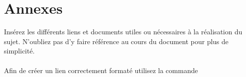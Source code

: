 \section{Annexes}
Insérez les différents liens et documents utiles ou nécessaires à la réalisation du sujet.
N'oubliez pas d'y faire référence au cours du document pour plus de simplicité.\\
\br \\
Afin de créer un lien correctement formaté utilisez la commande\\
